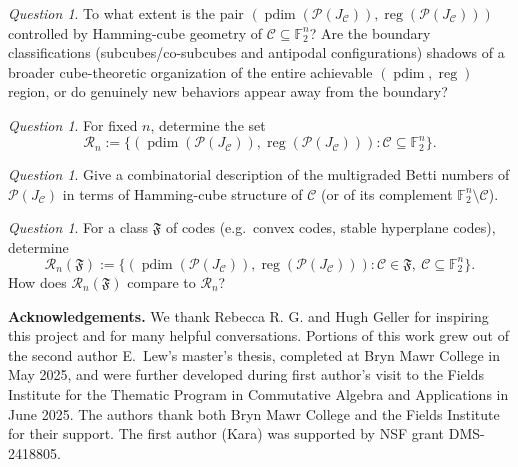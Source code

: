 \documentclass[12pt]{amsart}
\theoremstyle{remark}
\newtheorem{question}[theorem]{Question}
\theoremstyle{definition}
\DeclareMathOperator{\reg}{reg}
\DeclareMathOperator{\pd}{pdim}
\newcommand{\F}{\mathbb{F}}
\newcommand{\C}{\mathcal{C}}
\def\P{{\mathcal P}}
\begin{document}
\begin{question}\label{ques:duality-principle}
To what extent is the pair $(\pd(\P(J_\C)),\reg(\P(J_\C)))$ controlled by Hamming-cube geometry of
$\C\subseteq \F_2^n$?  Are the boundary classifications (subcubes/co-subcubes and antipodal configurations)
shadows of a broader cube-theoretic organization of the entire achievable $(\pd,\reg)$ region, or do
genuinely new behaviors appear away from the boundary?
\end{question}




\begin{question}\label{ques:region}
For fixed $n$, determine the set \[ \mathcal{R}_n:=\bigl\{(\pd(\P(J_\C)),\reg(\P(J_\C))) : \C\subseteq \F_2^n \bigr\}. \] 
\end{question}



\begin{question}\label{ques:betti}
Give a combinatorial description of the multigraded Betti numbers of $\P(J_\C)$ in terms of
Hamming-cube structure of $\C$ (or of its complement $\F_2^n\setminus\C$).
\end{question}


\begin{question}\label{ques:restricted-classes}
For a class $\mathfrak{F}$ of codes (e.g.\ convex codes, stable hyperplane codes), determine
\[
\mathcal{R}_n(\mathfrak{F}) := \{(\pd(\P(J_\C)),\reg(\P(J_\C))) : \C\in\mathfrak{F},\ \C\subseteq\F_2^n\}.
\]
How does $\mathcal{R}_n(\mathfrak{F})$ compare to $\mathcal{R}_n$?
\end{question}





\textbf{Acknowledgements.} We thank Rebecca R. G. and Hugh Geller for inspiring this project and for many helpful conversations. Portions of this work grew out of the second author E.~Lew’s master’s thesis, completed at Bryn Mawr College in May 2025, and were further developed during first author's visit to the Fields Institute for the Thematic Program in Commutative Algebra and Applications in June 2025. The authors thank both Bryn Mawr College and the Fields Institute for their support. The first author (Kara) was supported by NSF grant DMS-2418805.





\end{document}

